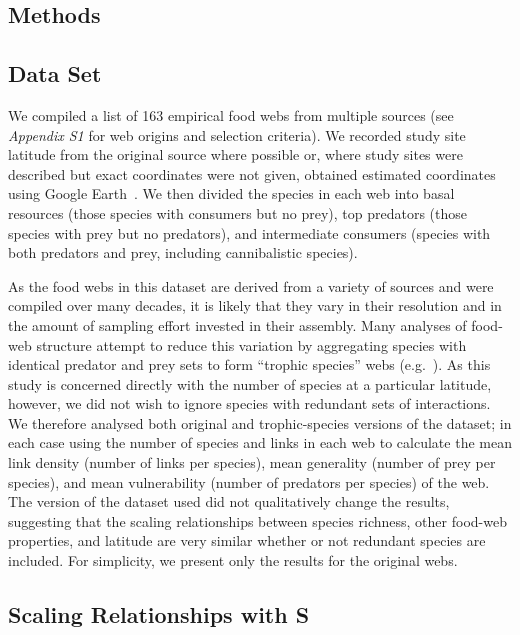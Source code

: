 \documentclass[12pt]{article}
\begin{document}
\begin{spacing}{1.0}
\section*{Methods}

  \subsection*{Data Set} 

    We compiled a list of 163 empirical food webs from
    multiple sources (see \emph{Appendix S1} for web origins and selection
    criteria). We recorded study site latitude from the original source where
    possible or, where study sites were described but exact coordinates were not
    given, obtained estimated coordinates using Google Earth~\citep{GoogleEarth}.
    We then divided the species in each web into basal resources (those species with
    consumers but no prey), top predators (those species with prey but no predators),
    and intermediate consumers (species with both predators and prey, including cannibalistic
    species). 


    As the food webs in this dataset are derived from a variety of sources and were compiled over many decades, it
    is likely that they vary in their resolution and in the amount of sampling effort invested in their assembly.
    Many analyses of food-web structure attempt to reduce this variation by aggregating species with identical predator and prey
    sets to form ``trophic species'' webs (e.g.~\citep{Martinez1991,Vermaat2009,Dunne2004,Dunne2013}). As this study
    is concerned directly with the number of species at a particular latitude, however, we did not wish to ignore 
    species with redundant sets of interactions. We therefore analysed both original and trophic-species versions
    of the dataset; in each case using the number of species and 
    links in each web to calculate the mean link density (number of links per species), mean generality 
    (number of prey per species), and mean vulnerability (number of predators per species) of the web. 
    The version of the dataset used did not qualitatively change the results, suggesting that
    the scaling relationships between species richness, other food-web properties, and latitude are very 
    similar whether or not redundant species are included. For simplicity, we present only
    the results for the original webs.


  \subsection*{Scaling Relationships with S}


\end{spacing}
\end{document}
